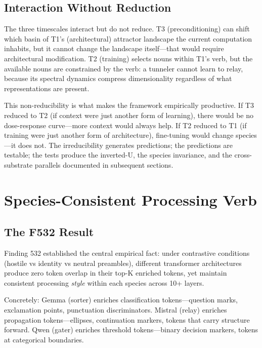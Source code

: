 \documentclass[12pt]{article}
\begin{document}
\subsection{Interaction Without Reduction}

The three timescales interact but do not reduce. T3 (preconditioning) can shift which basin of T1's (architectural) attractor landscape the current computation inhabits, but it cannot change the landscape itself---that would require architectural modification. T2 (training) selects nouns within T1's verb, but the available nouns are constrained by the verb: a tunneler cannot learn to relay, because its spectral dynamics compress dimensionality regardless of what representations are present.

This non-reducibility is what makes the framework empirically productive. If T3 reduced to T2 (if context were just another form of learning), there would be no dose-response curve---more context would always help. If T2 reduced to T1 (if training were just another form of architecture), fine-tuning would change species---it does not. The irreducibility generates predictions; the predictions are testable; the tests produce the inverted-U, the species invariance, and the cross-substrate parallels documented in subsequent sections.

\section{Species-Consistent Processing Verb}

\subsection{The F532 Result}

Finding 532 established the central empirical fact: under contrastive conditions (hostile vs identity vs neutral preambles), different transformer architectures produce zero token overlap in their top-K enriched tokens, yet maintain consistent processing \emph{style} within each species across 10+ layers.

Concretely: Gemma (sorter) enriches classification tokens---question marks, exclamation points, punctuation discriminators. Mistral (relay) enriches propagation tokens---ellipses, continuation markers, tokens that carry structure forward. Qwen (gater) enriches threshold tokens---binary decision markers, tokens at categorical boundaries.
\end{document}

